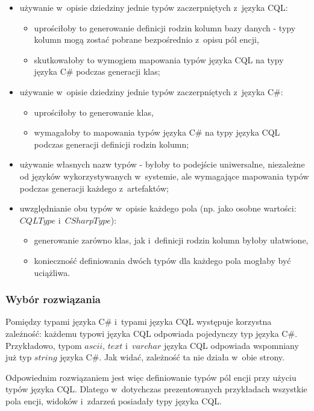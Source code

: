 \begin{itemize}
 \item używanie w~opisie dziedziny jednie typów zaczerpniętych z~języka CQL:
  \begin{itemize}
   \item uprościłoby to generowanie definicji rodzin kolumn bazy danych - typy kolumn mogą zostać pobrane bezpośrednio z~opisu pól encji,
   \item skutkowałoby to wymogiem mapowania typów języka CQL na typy języka C\# podczas generacji klas;
  \end{itemize}
 \item używanie w~opisie dziedziny jednie typów zaczerpniętych z~języka C\#:
  \begin{itemize}
   \item uprościłoby to generowanie klas,
   \item wymagałoby to mapowania typów języka C\# na typy języka CQL podczas generacji definicji rodzin kolumn;
  \end{itemize}
 \item używanie własnych nazw typów - byłoby to podejście uniwersalne, niezależne od języków wykorzystywanych w~systemie, ale wymagające mapowania typów podczas generacji każdego z~artefaktów;
 \item uwzględnianie obu typów w~opisie każdego pola (np. jako osobne wartości: $CQLType$ i~$CSharpType$):
  \begin{itemize}
   \item generowanie zarówno klas, jak i~definicji rodzin kolumn byłoby ułatwione,
   \item konieczność definiowania dwóch typów dla każdego pola mogłaby być uciążliwa.
  \end{itemize}
\end{itemize}

\subsubsection{Wybór rozwiązania}

Pomiędzy typami języka C\# i~typami języka CQL występuje korzystna zależność: każdemu typowi języka CQL odpowiada pojedynczy typ języka C\#.
Przykładowo, typom $ascii$, $text$ i~$varchar$ języka CQL odpowiada wspomniany już typ $string$ języka C\#.
Jak widać, zależność ta nie działa w~obie strony.

Odpowiednim rozwiązaniem jest więc definiowanie typów pól encji przy użyciu typów języka CQL.
Dlatego w~dotychczas prezentowanych przykładach wszystkie pola encji, widoków i~zdarzeń posiadały typy języka CQL.

